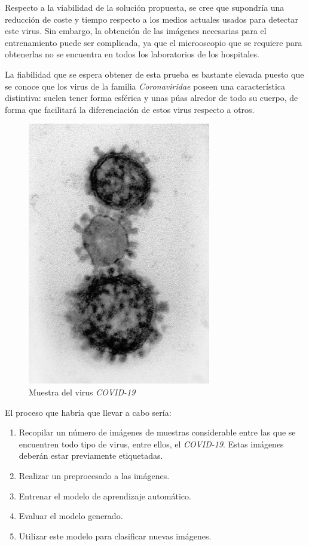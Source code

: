 \documentclass{uc3mpracticas}
\begin{document}
  \vspace{2mm}

  Respecto a la viabilidad de la solución propuesta, se cree que supondría una reducción de coste y tiempo respecto a los medios actuales usados para detectar este virus. Sin embargo, la obtención de las imágenes necesarias para el entrenamiento puede ser complicada, ya que el microoscopio que se requiere para obtenerlas no se encuentra en todos los laboratorios de los hospitales.

  \vspace{2mm}

  La fiabilidad que se espera obtener de esta prueba es bastante elevada puesto que se conoce que los virus de la familia \textit{Coronaviridae} poseen una característica distintiva: suelen tener forma esférica y unas púas alredor de todo su cuerpo, de forma que facilitará la diferenciación de estos virus respecto a otros.

  \begin{figure}[H]
    \begin{center}
      \includegraphics[angle=90,width=80mm, frame]{Images/coronaviridae/coronaviridae_0009.jpg}
      \caption{Muestra del virus \textit{COVID-19}}
    \end{center}
  \end{figure}

  El proceso que habría que llevar a cabo sería:

  \begin{enumerate}
    \item Recopilar un número de imágenes de muestras considerable entre las que se encuentren todo tipo de virus, entre ellos, el \textit{COVID-19}. Estas imágenes deberán estar previamente etiquetadas.
    \item Realizar un preprocesado a las imágenes.
    \item Entrenar el modelo de aprendizaje automático.
    \item Evaluar el modelo generado.
    \item Utilizar este modelo para clasificar nuevas imágenes.
  \end{enumerate}
\end{document}
